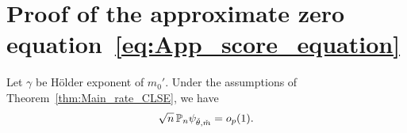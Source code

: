 \section[Proof of  the approximate zero equation (\ref{eq:App_score_equation})]{Proof of the approximate zero equation~\eqref{eq:App_score_equation}} %
\label{sec:proof_of_eq:app_score_equation}


\begin{thm}\label{thm:projection}
Let $\gamma$ be H\"{o}lder exponent of $m_0'$. Under the assumptions of Theorem~\ref{thm:Main_rate_CLSE}, we have
 \begin{equation}\label{eq:App_score_equation1}
   \sqrt{n}\, \mathbb{P}_n \psi_{\check{\theta},\check{m}} =o_p(1).
   \end{equation}
\end{thm}

